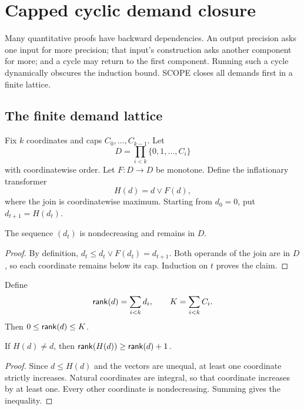\section{Capped cyclic demand closure}
\label{sec:demand-closure}

Many quantitative proofs have backward dependencies.  An output precision asks one input for more precision; that input's construction asks another component for more; and a cycle may return to the first component.  Running such a cycle dynamically obscures the induction bound.  SCOPE closes all demands first in a finite lattice.

\subsection{The finite demand lattice}

Fix \(k\) coordinates and caps \(C_0,\ldots,C_{k-1}\).  Let
\[
  D=\prod_{i<k}\{0,1,\ldots,C_i\}
\]
with coordinatewise order.  Let \(F:D\to D\) be monotone.  Define the inflationary transformer
\[
  H(d)=d\vee F(d),
\]
where the join is coordinatewise maximum.  Starting from \(d_0=0\), put \(d_{t+1}=H(d_t)\).

\begin{lemma}
The sequence \((d_t)\) is nondecreasing and remains in \(D\).
\end{lemma}
\begin{proof}
By definition, \(d_t\le d_t\vee F(d_t)=d_{t+1}\).  Both operands of the join are in \(D\), so each coordinate remains below its cap.  Induction on \(t\) proves the claim.
\end{proof}

Define
\[
  \mathsf{rank}(d)=\sum_{i<k}d_i,
  \qquad
  K=\sum_{i<k}C_i.
\]
Then \(0\le\mathsf{rank}(d)\le K\).

\begin{lemma}
If \(H(d)\ne d\), then \(\mathsf{rank}(H(d))\ge\mathsf{rank}(d)+1\).
\end{lemma}
\begin{proof}
Since \(d\le H(d)\) and the vectors are unequal, at least one coordinate strictly increases.  Natural coordinates are integral, so that coordinate increases by at least one.  Every other coordinate is nondecreasing.  Summing gives the inequality.
\end{proof}

